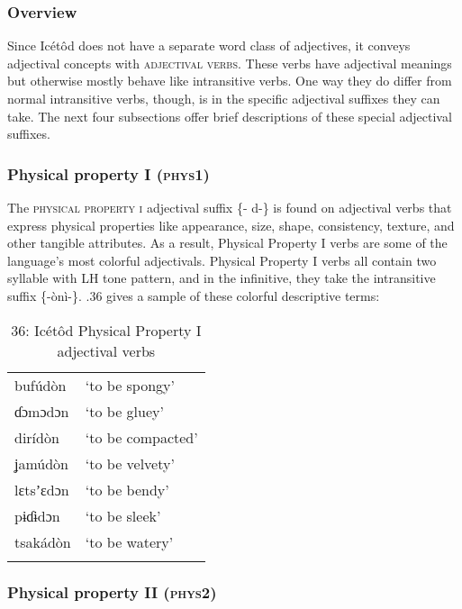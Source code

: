 \subsubsection{Overview}

Since Icétôd does not have a separate word class of adjectives, it conveys adjectival concepts with \textsc{adjectival verbs}. These verbs have adjectival meanings but otherwise mostly behave like intransitive verbs. One way they do differ from normal intransitive verbs, though, is in the specific adjectival suffixes they can take. The next four subsections offer brief descriptions of these special adjectival suffixes.


\subsubsection{Physical property I (\textsc{phys1})}

The \textsc{physical property i} adjectival suffix \{- d-\} is found on adjectival verbs that express physical properties like appearance, size, shape, consistency, texture, and other tangible attributes. As a result, Physical Property I verbs are some of the language’s most colorful adjectivals. Physical Property I verbs all contain two syllable with LH tone pattern, and in the infinitive, they take the intransitive suffix \{-ònì-\}. .36 gives a sample of these colorful descriptive terms:


\begin{table}
\caption{36: Icétôd Physical Property I adjectival verbs}
\label{tab:8}


\begin{tabularx}{\textwidth}{XX}
\lsptoprule

bufúdòn & ‘to be spongy’\\
ɗɔmɔdɔn & ‘to be gluey’\\
dirídòn & ‘to be compacted’\\
ʝamúdòn & ‘to be velvety’\\
lɛtsʼɛdɔn & ‘to be bendy’\\
pɨɗɨdɔn & ‘to be sleek’\\
tsakádòn & ‘to be watery’\\
\lspbottomrule
\end{tabularx}
\end{table}

\subsubsection{Physical property II (\textsc{phys2})}

